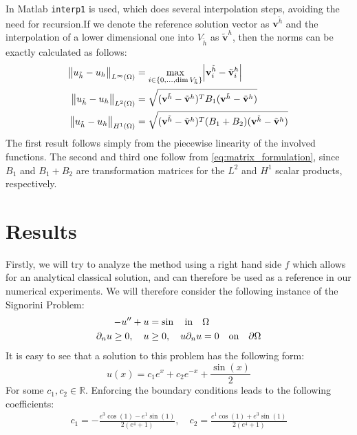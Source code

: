 \documentclass[headsepline,footsepline,footinclude=false,oneside,fontsize=11pt,paper=a4,listof=totoc,bibliography=totoc]{scrbook} %
\begin{document}
In Matlab \verb|interp1| is used, which does several interpolation steps, avoiding the need for recursion.If we denote the reference solution vector as $\mathbf{v}^{\tilde{h}}$ and the interpolation of a lower dimensional one into $V_{\tilde{h}}$ as $\tilde{\mathbf{v}}^h$, then the norms can be exactly calculated as follows:
\begin{align}
\norm{u_{\tilde{h}} - u_h}_{L^\infty(\Omega)} &= \max_{i \in \{0,\dots,\mathrm{dim} \, V_{\tilde{h}}\}} \abs{\mathbf{v}^{\tilde{h}}_i - \tilde{\mathbf{v}}^h_i} \\
\norm{u_{\tilde{h}} - u_h}_{L^2(\Omega)} &=  \sqrt{(\mathbf{v}^{\tilde{h}} - \tilde{\mathbf{v}}^h)^T B_1 (\mathbf{v}^{\tilde{h}} - \tilde{\mathbf{v}}^h)}\\
\norm{u_{\tilde{h}} - u_h}_{H^1(\Omega)} &= \sqrt{(\mathbf{v}^{\tilde{h}} - \tilde{\mathbf{v}}^h)^T (B_1+B_2) (\mathbf{v}^{\tilde{h}} - \tilde{\mathbf{v}}^h)}
\end{align}
The first result follows simply from the piecewise linearity of the involved functions. The second and third one follow from \eqref{eq:matrix_formulation}, since $B_1$ and $B_1 + B_2$ are transformation matrices for the $L^2$ and $H^1$ scalar products, respectively.

\section{Results}
Firstly, we will try to analyze the method using a right hand side $f$ which allows for an analytical classical solution, and can therefore be used as a reference in our numerical experiments. We will therefore consider the following instance of the Signorini Problem:
\begin{align*}
-u'' + u &= \sin \quad \textnormal{in} \quad \Omega \\ 
\partial_n u \geq 0,\quad u &\geq 0,\quad u\partial_nu = 0 \quad\textnormal{on}\quad \partial \Omega 
\end{align*}
It is easy to see that a solution to this problem has the following form:
\begin{equation*}
	u(x) = c_1 e^x + c_2 e^{-x} + \frac{\sin(x)}{2}
\end{equation*}
For some $c_1,c_2 \in \mathbb{R}$. Enforcing the boundary conditions leads to the following coefficients:
\begin{align*}
c_1 = - \frac{e^3\cos(1) - e^1\sin(1)}{2(e^4 + 1)}, \quad c_2 = \frac{e^1\cos(1) + e^3\sin(1)}{2(e^4 + 1)}
\end{align*}
\end{document}
